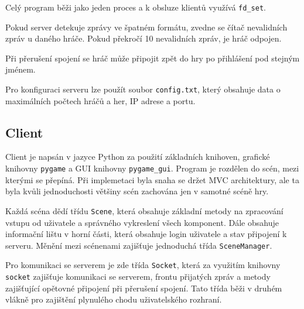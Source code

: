 \documentclass[11pt,a4paper]{article}
\begin{document}
Celý program běži jako jeden proces a k obsluze klientů využívá \texttt{fd\_set}.

Pokud server detekuje zprávy ve špatném formátu, zvedne se čítač nevalidních zpráv u daného hráče. Pokud překročí 10 nevalidních zpráv, je hráč odpojen.

Při přerušení spojení se hráč může připojit zpět do hry po přihlášení pod stejným jménem.

Pro konfiguraci serveru lze použít soubor \texttt{config.txt}, který obsahuje data o maximálních počtech hráčů a her, IP adrese a portu.
\subsection{Client}
Client je napsán v jazyce Python za použití základních knihoven, grafické knihovny \texttt{pygame} a GUI knihovny \texttt{pygame\_gui}. Program je rozdělen do scén, mezi kterými se přepíná. Při implemetaci byla snaha se držet MVC architektury, ale ta byla kvůli jednoduchosti většiny scén zachována jen v samotné scéně hry. 

Každá scéna dědí třídu \texttt{Scene}, která obsahuje základní metody na zpracování vstupu od uživatele a správného vykreslení všech komponent. Dále obsahuje informační lištu v horní části, která obsahuje login uživatele a stav připojení k serveru. Měnění mezi scénenami zajišťuje jednoduchá třída \texttt{SceneManager}.

Pro komunikaci se serverem je zde třída \texttt{Socket}, která za využitím knihovny \texttt{socket} zajišťuje komunikaci se serverem, frontu přijatých zpráv a metody zajišťující opětovné připojení při přerušení spojení. Tato třída běži v druhém vlákně pro zajištění plynulého chodu uživatelského rozhraní.
\end{document}
